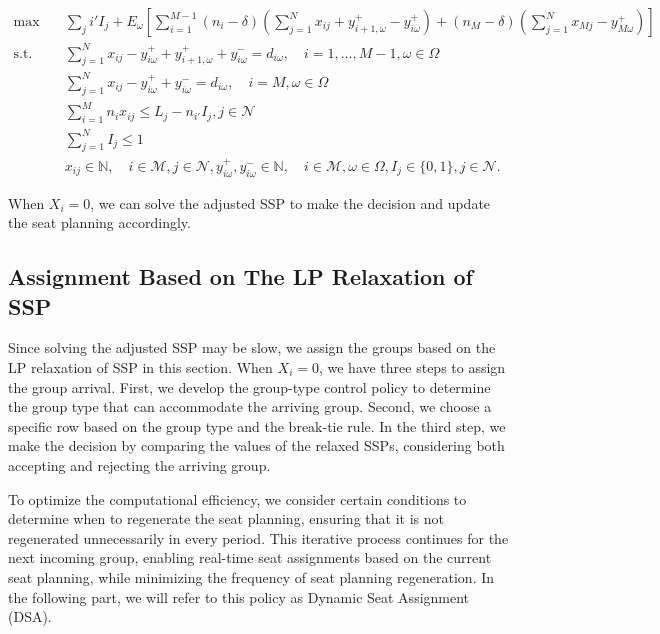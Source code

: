 \begin{equation}\label{adjusted_SSP}
  \begin{aligned}
  \max \quad & \sum_{j} i{'} I_j + E_{\omega}\left[\sum_{i=1}^{M-1} (n_i-\delta) (\sum_{j= 1}^{N} x_{ij} + y_{i+1,\omega}^{+} - y_{i \omega}^{+}) + (n_{M}-\delta) (\sum_{j= 1}^{N} x_{Mj} - y_{M \omega}^{+})\right] \\
  \text {s.t.} \quad & \sum_{j= 1}^{N} x_{ij}-y_{i \omega}^{+}+
  y_{i+1, \omega}^{+} + y_{i \omega}^{-}=d_{i \omega}, \quad i = 1,\ldots,M-1, \omega \in \Omega \\
  & \sum_{j= 1}^{N} x_{ij} -y_{i \omega}^{+}+y_{i \omega}^{-}=d_{i \omega}, \quad i = M, \omega \in \Omega \\
  & \sum_{i=1}^{M} n_{i} x_{ij} \leq L_j - n_{i{'}} I_j, j \in \mathcal{N} \\
  & \sum_{j=1}^{N} I_j \leq 1 \\
  & x_{ij} \in \mathbb{N}, \quad i \in \mathcal{M}, j \in \mathcal{N}, y_{i \omega}^{+}, y_{i \omega}^{-} \in \mathbb{N}, \quad i \in \mathcal{M}, \omega \in \Omega,  I_j \in \{0,1\}, j \in \mathcal{N}.
  \end{aligned}
\end{equation}

When $X_i = 0$, we can solve the adjusted SSP to make the decision and update the seat planning accordingly.


\subsection{Assignment Based on The LP Relaxation of SSP}
Since solving the adjusted SSP may be slow, we assign the groups based on the LP relaxation of SSP in this section. When $X_i = 0$, we have three steps to assign the group arrival. First, we develop the group-type control policy to determine the group type that can accommodate the arriving group. Second, we choose a specific row based on the group type and the break-tie rule. In the third step, we make the decision by comparing the values of the relaxed SSPs, considering both accepting and rejecting the arriving group.

To optimize the computational efficiency, we consider certain conditions to determine when to regenerate the seat planning, ensuring that it is not regenerated unnecessarily in every period. This iterative process continues for the next incoming group, enabling real-time seat assignments based on the current seat planning, while minimizing the frequency of seat planning regeneration. In the following part, we will refer to this policy as Dynamic Seat Assignment (DSA).


